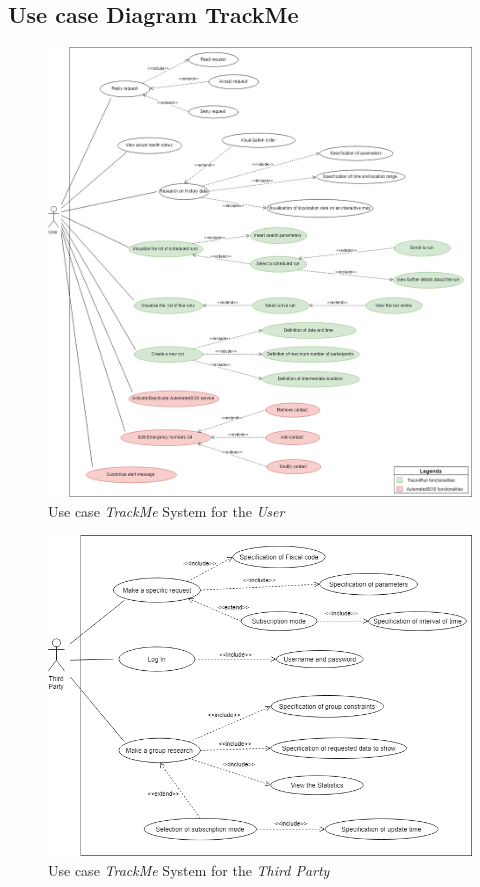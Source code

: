 \subsection{Use case Diagram TrackMe}

\begin{figure}[H]
    \centering
    \includegraphics[scale=0.4]{rasdL/Pictures/trackMeUseCaseUser.png}
    \caption{Use case  \emph{TrackMe} System for the \emph{User}}
\end{figure}

\begin{figure}[H]
    \centering
    \includegraphics[scale=0.4]{rasdL/Pictures/trackMeUseCaseThirdParty.png}
    \caption{Use case  \emph{TrackMe} System for the \emph{Third Party}}
\end{figure}

